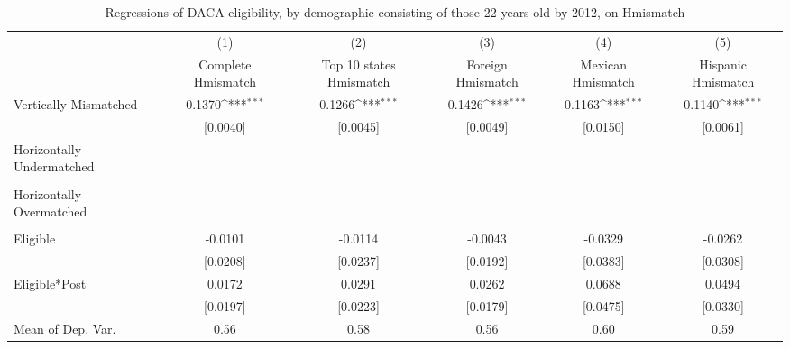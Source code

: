 \begin{table}[htbp]\centering
\def\sym#1{\ifmmode^{#1}\else\(^{#1}\)\fi}
\caption{Regressions of DACA eligibility, by demographic consisting of those 22 years old by 2012, on Hmismatch}
\begin{tabular}{l*{5}{c}}
\toprule
                    &\multicolumn{1}{c}{(1)}         &\multicolumn{1}{c}{(2)}         &\multicolumn{1}{c}{(3)}         &\multicolumn{1}{c}{(4)}         &\multicolumn{1}{c}{(5)}         \\
                    &Complete Hmismatch         &Top 10 states Hmismatch         &Foreign Hmismatch         &Mexican Hmismatch         &Hispanic Hmismatch         \\
\midrule
Vertically Mismatched&      0.1370\sym{***}&      0.1266\sym{***}&      0.1426\sym{***}&      0.1163\sym{***}&      0.1140\sym{***}\\
                    &    [0.0040]         &    [0.0045]         &    [0.0049]         &    [0.0150]         &    [0.0061]         \\
\addlinespace
Horizontally Undermatched&                     &                     &                     &                     &                     \\
                    &                     &                     &                     &                     &                     \\
\addlinespace
Horizontally Overmatched&                     &                     &                     &                     &                     \\
                    &                     &                     &                     &                     &                     \\
\addlinespace
Eligible            &     -0.0101         &     -0.0114         &     -0.0043         &     -0.0329         &     -0.0262         \\
                    &    [0.0208]         &    [0.0237]         &    [0.0192]         &    [0.0383]         &    [0.0308]         \\
\addlinespace
Eligible*Post       &      0.0172         &      0.0291         &      0.0262         &      0.0688         &      0.0494         \\
                    &    [0.0197]         &    [0.0223]         &    [0.0179]         &    [0.0475]         &    [0.0330]         \\
\midrule
Mean of Dep. Var.   &        0.56         &        0.58         &        0.56         &        0.60         &        0.59         \\

\end{tabular}
\end{table}
